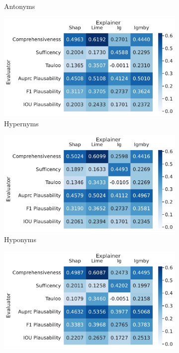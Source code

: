 \begin{figure}[t!]
\begin{subfigure}{0.49\textwidth}
        \caption{Antonyms}
    \end{subfigure}
    \begin{subfigure}{0.49\textwidth}
        \includegraphics[width=\textwidth]{./images/ferret_heatmaps_phenomena/default_mnli/hypernym.pdf}
        \caption{Hypernyms}
    \end{subfigure}
    \begin{subfigure}{0.49\textwidth}
        \includegraphics[width=\textwidth]{./images/ferret_heatmaps_phenomena/default_mnli/hyponym.pdf}
        \caption{Hyponyms}
    \end{subfigure}
    \begin{subfigure}{0.49\textwidth}
        \includegraphics[width=\textwidth]{./images/ferret_heatmaps_phenomena/default_mnli/co_hyponym.pdf}

\end{subfigure}
\end{figure}
